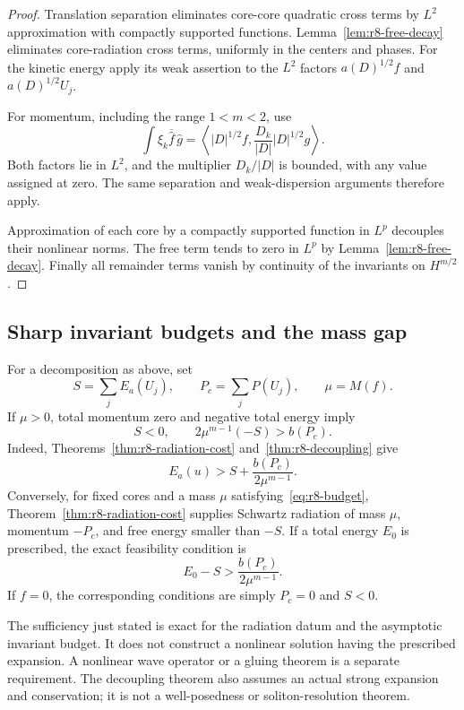 \begin{proof}
Translation separation eliminates core-core quadratic cross terms by $L^2$ approximation with compactly supported functions. Lemma~\ref{lem:r8-free-decay} eliminates core-radiation cross terms, uniformly in the centers and phases. For the kinetic energy apply its weak assertion to the $L^2$ factors $a(D)^{1/2}f$ and $a(D)^{1/2}U_j$.

For momentum, including the range $1<m<2$, use
\[
 \int\xi_k\overline{\widehat f}\,\widehat g
 =\left\langle |D|^{1/2}f,
 \frac{D_k}{|D|}|D|^{1/2}g\right\rangle.
\]
Both factors lie in $L^2$, and the multiplier $D_k/|D|$ is bounded, with any value assigned at zero. The same separation and weak-dispersion arguments therefore apply.

Approximation of each core by a compactly supported function in $L^p$ decouples their nonlinear norms. The free term tends to zero in $L^p$ by Lemma~\ref{lem:r8-free-decay}. Finally all remainder terms vanish by continuity of the invariants on $H^{m/2}$.
\end{proof}

\subsection{Sharp invariant budgets and the mass gap}

For a decomposition as above, set
\[
 S=\sum_jE_a(U_j),\qquad P_c=\sum_jP(U_j),\qquad\mu=M(f).
\]
If $\mu>0$, total momentum zero and negative total energy imply
\begin{equation}\label{eq:r8-budget}
 \boxed{\quad S<0,\qquad 2\mu^{m-1}(-S)>b(P_c).\quad}
\end{equation}
Indeed, Theorems~\ref{thm:r8-radiation-cost} and~\ref{thm:r8-decoupling} give
\[
 E_a(u)>S+\frac{b(P_c)}{2\mu^{m-1}}.
\]
Conversely, for fixed cores and a mass $\mu$ satisfying~\eqref{eq:r8-budget}, Theorem~\ref{thm:r8-radiation-cost} supplies Schwartz radiation of mass $\mu$, momentum $-P_c$, and free energy smaller than $-S$. If a total energy $E_0$ is prescribed, the exact feasibility condition is
\begin{equation}\label{eq:r8-prescribed-budget}
 E_0-S>\frac{b(P_c)}{2\mu^{m-1}}.
\end{equation}
If $f=0$, the corresponding conditions are simply $P_c=0$ and $S<0$.

\begin{remark}
The sufficiency just stated is exact for the radiation datum and the asymptotic invariant budget. It does not construct a nonlinear solution having the prescribed expansion. A nonlinear wave operator or a gluing theorem is a separate requirement. The decoupling theorem also assumes an actual strong expansion and conservation; it is not a well-posedness or soliton-resolution theorem.
\end{remark}

